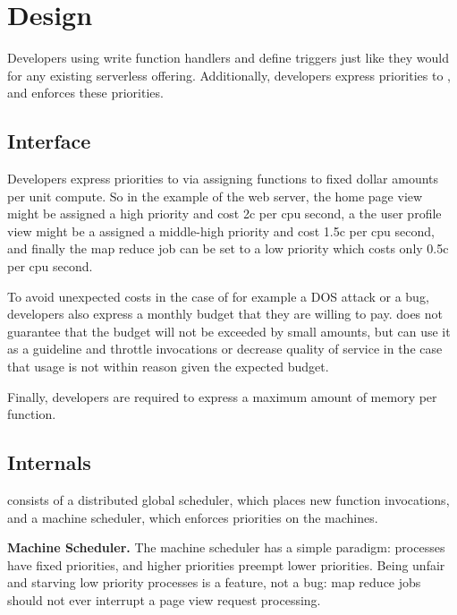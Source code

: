 \section{Design}




Developers using \sys{} write function handlers and define triggers just like
they would for any existing serverless offering. Additionally, developers
express priorities to \sys{}, and \sys{} enforces these priorities.



\subsection{Interface}

Developers express priorities to \sys{} via assigning functions to fixed dollar
amounts per unit compute. So in the example of the web server, the home page
view might be assigned a high priority and cost 2c per cpu second, a the user
profile view might be a assigned a middle-high priority and cost 1.5c per cpu
second, and finally the map reduce job can be set to a low priority which costs
only 0.5c per cpu second.
 
To avoid unexpected costs in the case of for example a DOS attack or a bug,
developers also express a monthly budget that they are willing to pay.
\sys{} does not guarantee that the budget will not be exceeded by small amounts,
but can use it as a guideline and throttle invocations or decrease quality of
service in the case that usage is not within reason given the expected budget.

Finally, developers are required to express a maximum amount of memory per
function.



\subsection{Internals}

\sys{} consists of a distributed global scheduler, which places new function
invocations, and a machine scheduler, which enforces priorities on the machines.


\textbf{Machine Scheduler.} 
The machine scheduler has a simple paradigm: processes have fixed priorities,
and higher priorities preempt lower priorities. Being unfair and starving low
priority processes is a feature, not a bug: map reduce jobs should not ever
interrupt a page view request processing.

